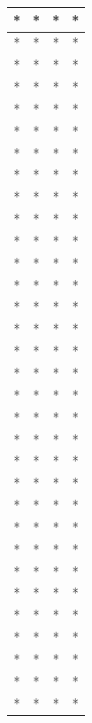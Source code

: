 \begin{table}[ht]
\begin{tabular}{|c|c|c|c|}
\hline
* & * & * & * \\
\hline
* & * & * & * \\
\hline
* & * & * & * \\
\hline
* & * & * & * \\
\hline
* & * & * & * \\
\hline
* & * & * & * \\
\hline
* & * & * & * \\
\hline
* & * & * & * \\
\hline
* & * & * & * \\
\hline
* & * & * & * \\
\hline
* & * & * & * \\
\hline
* & * & * & * \\
\hline
* & * & * & * \\
\hline
* & * & * & * \\
\hline
* & * & * & * \\
\hline
* & * & * & * \\
\hline
* & * & * & * \\
\hline
* & * & * & * \\
\hline
* & * & * & * \\
\hline
* & * & * & * \\
\hline
* & * & * & * \\
\hline
* & * & * & * \\
\hline
* & * & * & * \\
\hline
* & * & * & * \\
\hline
* & * & * & * \\
\hline
* & * & * & * \\
\hline
* & * & * & * \\
\hline
* & * & * & * \\
\hline
* & * & * & * \\
\hline
* & * & * & * \\
\hline
* & * & * & * \\
\hline
* & * & * & * \\
\hline
\end{tabular}
\end{table}

